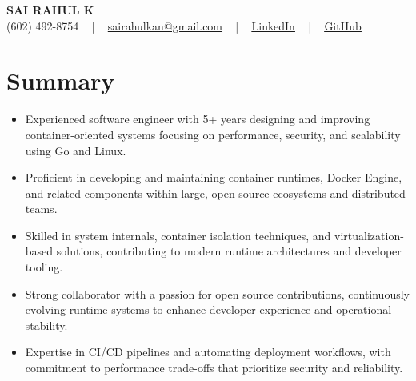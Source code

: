 \documentclass[letterpaper,11pt]{article}
\newcommand{\resumeItem}[1]{
  \item\footnotesize{
    {#1 \vspace{-2pt}}
  }
}
\newcommand{\resumeItemListStart}{\begin{itemize}[leftmargin=*]}
\newcommand{\resumeItemListEnd}{\end{itemize}\vspace{-5pt}}
\begin{document}
\begin{center}
    {\fontsize{14pt}{12pt}\selectfont \textbf{\MakeUppercase{Sai Rahul K}}}\\ \vspace{2pt}
    \fontsize{10pt}{12pt}\selectfont (602) 492-8754 ~ | ~ \href{mailto:sairahulkan@gmail.com}{sairahulkan@gmail.com} ~ | ~
    \href{https://www.linkedin.com/in/rq123/}{\color{blue}\underline{LinkedIn}} ~ | ~
    \href{https://github.com/kanrahuldo}{\color{blue}\underline{GitHub}}~
    \vspace{-8pt}
\end{center}

\section{Summary}
\fontsize{9pt}{10pt}\selectfont
\resumeItemListStart
    \resumeItem{Experienced software engineer with 5+ years designing and improving container-oriented systems focusing on performance, security, and scalability using Go and Linux.}
    \resumeItem{Proficient in developing and maintaining container runtimes, Docker Engine, and related components within large, open source ecosystems and distributed teams.}
    \resumeItem{Skilled in system internals, container isolation techniques, and virtualization-based solutions, contributing to modern runtime architectures and developer tooling.}
    \resumeItem{Strong collaborator with a passion for open source contributions, continuously evolving runtime systems to enhance developer experience and operational stability.}
    \resumeItem{Expertise in CI/CD pipelines and automating deployment workflows, with commitment to performance trade-offs that prioritize security and reliability.}
\resumeItemListEnd
\vspace{-6pt}
\end{document}
